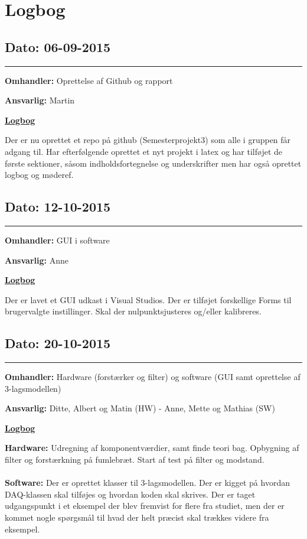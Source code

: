 \chapter{Logbog}

\section{Dato: 06-09-2015}
\hrule
\textbf{Omhandler:} Oprettelse af Github og rapport

\textbf{Ansvarlig:} Martin

\underline{\textbf{Logbog}}


Der er nu oprettet et repo på github (Semesterprojekt3) som alle i gruppen får adgang til. Har efterfølgende oprettet et nyt projekt i latex og har tilføjet de første sektioner, såsom indholdsfortegnelse og underskrifter men har også oprettet logbog og møderef.

\section{Dato: 12-10-2015}
\hrule
\textbf{Omhandler:} GUI i software 

\textbf{Ansvarlig:} Anne

\underline{\textbf{Logbog}}

Der er lavet et GUI udkast i Visual Studios. Der er tilføjet forskellige Forms til brugervalgte instillinger. Skal der nulpunktsjusteres og/eller kalibreres.

\section{Dato: 20-10-2015}
\hrule
\textbf{Omhandler:} Hardware (forstærker og filter) og software (GUI samt oprettelse af 3-lagsmodellen) 

\textbf{Ansvarlig:} Ditte, Albert og Matin (HW) - Anne, Mette og Mathias (SW)

\underline{\textbf{Logbog}}

\textbf{Hardware:} Udregning af komponentværdier, samt finde teori bag. Opbygning af filter og forstærkning på fumlebræt. Start af test på filter og modstand. \\
\\ 
\textbf{Software:} Der er oprettet klasser til 3-lagsmodellen. Der er kigget på hvordan DAQ-klassen skal tilføjes og hvordan koden skal skrives. Der er taget udgangspunkt i et eksempel der blev fremvist for flere fra studiet, men der er kommet nogle spørgsmål til hvad der helt præcist skal trækkes videre fra eksempel.


